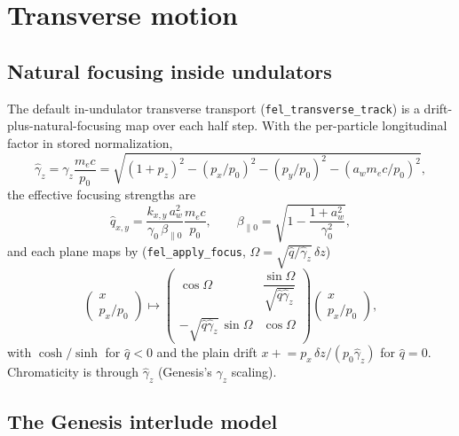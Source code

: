 \documentclass[11pt]{article}
\newcommand{\code}[1]{\texttt{#1}}
\begin{document}
\section{Transverse motion}\label{sec:transverse}

\subsection{Natural focusing inside undulators}\label{sec:natfocus}

The default in-undulator transverse transport (\code{fel\_transverse\_track}) is a
drift-plus-natural-focusing map over each half step. With the per-particle
longitudinal factor in stored normalization,
\begin{equation}\label{eq:gzhat}
  \hat\gamma_z = \gamma_z\frac{m_ec}{p_0} = \sqrt{(1+p_z)^2 - (p_x/p_0)^2 - (p_y/p_0)^2
   - (a_w m_ec/p_0)^2},
\end{equation}
the effective focusing strengths are
\begin{equation}\label{eq:qnat}
  \hat q_{x,y} = \frac{k_{x,y}\, a_w^2}{\gamma_0\,\beta_{\parallel 0}}\frac{m_ec}{p_0},
  \qquad
  \beta_{\parallel 0} = \sqrt{1 - \frac{1 + a_w^2}{\gamma_0^2}},
\end{equation}
and each plane maps by (\code{fel\_apply\_focus}, $\Omega = \sqrt{\hat q/\hat\gamma_z}\,
\delta z$)
\begin{equation}\label{eq:focusmap}
  \begin{pmatrix} x \\ p_x/p_0 \end{pmatrix} \mapsto
  \begin{pmatrix} \cos\Omega & \dfrac{\sin\Omega}{\sqrt{\hat q \hat\gamma_z}} \\[6pt]
    -\sqrt{\hat q\hat\gamma_z}\,\sin\Omega & \cos\Omega \end{pmatrix}
  \begin{pmatrix} x \\ p_x/p_0 \end{pmatrix},
\end{equation}
with $\cosh/\sinh$ for $\hat q<0$ and the plain drift $x \mathrel{+}= p_x\,\delta z/
(p_0\hat\gamma_z)$ for $\hat q = 0$. Chromaticity is through $\hat\gamma_z$
(Genesis's $\gamma_z$ scaling).

\subsection{The Genesis interlude model}\label{sec:interlude}
\end{document}
